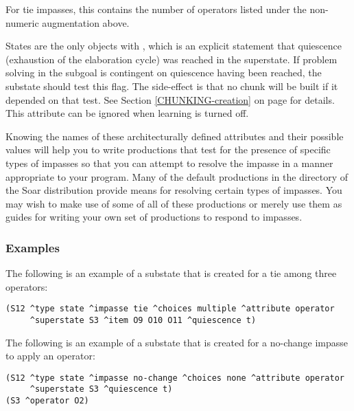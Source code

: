 \begin{description}
	\vspace{-8pt}
\item [\soar{\carat non-numeric-count}] For tie impasses, this contains the number of 
	operators listed under the non-numeric augmentation above.
	\vspace{-8pt}
\item [\soar{\carat quiescence}] States are the only objects with , 
	which is an explicit statement that quiescence (exhaustion of the elaboration cycle) 
	was reached in the superstate.  If problem solving in the subgoal is contingent on 
	quiescence having been reached, the substate should test this flag. The side-effect 
	is that no chunk will be built if it depended on that test. 
	See Section \ref{CHUNKING-creation} on page \pageref{CHUNKING-creation} for
	details. This attribute can be ignored when learning is turned off.
\end{description} 

Knowing the names of these architecturally defined attributes and their
possible values will help you to write productions that test for the presence
of specific types of impasses so that you can attempt to resolve the impasse
in a manner appropriate to your program. Many of the default
productions in the  directory of the Soar distribution
 provide means for resolving
certain types of impasses. You may wish to make use of some of all of these
productions or merely use them as guides for writing your own set of
productions to respond to impasses.

\subsubsection*{Examples}


The following is an example of a substate that is created for a tie among
three operators:
\begin{verbatim}
(S12 ^type state ^impasse tie ^choices multiple ^attribute operator 
     ^superstate S3 ^item O9 O10 O11 ^quiescence t)
\end{verbatim} \vspace{12pt}

The following is an example of a substate that is created for a no-change
impasse to apply an operator:
\begin{verbatim}
(S12 ^type state ^impasse no-change ^choices none ^attribute operator 
     ^superstate S3 ^quiescence t)
(S3 ^operator O2)
\end{verbatim} \vspace{12pt}

